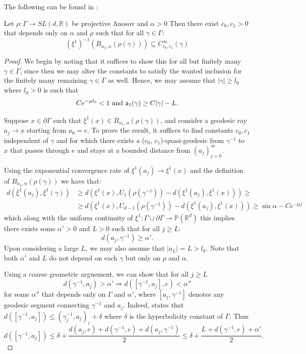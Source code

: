\documentclass{report}
\begin{document}
The following can be found in \cite[Proposition 3.3]{pozzetti_anosov_2023}:
\begin{proposition}
    Let $\rho: \Gamma \to SL(d, \mathbb R)$ be projective Anosov and $\alpha > 0$
    Then there exist $c_0, c_1 > 0$ that depends only on $\alpha$ and $\rho$ such that for all $\gamma \in \Gamma$:
    \[
        (\xi^1)^{-1}(B_{\alpha_1, \alpha}(\rho(\gamma))) \subseteq C_{c_0,c_1}^\infty(\gamma)
    \]
\end{proposition}
\begin{proof}
    We begin by noting that it suffices to show this for all but finitely many $\gamma \in \Gamma$, since then we may alter the constants to satisfy the wanted inclusion for the finitely many remaining $\gamma \in \Gamma$ as well. 
    Hence, we may assume that $|\gamma| \geq l_0$ where $l_0 > 0$ is such that 
    \[
        Ce^{-\mu l_0} < 1 \text{ and } {\sf a}_1(\gamma) \geq C|\gamma| - L.
    \]

    Suppose $x \in \partial \Gamma$ such that $\xi^1(x) \in B_{\alpha_1, \alpha}(\rho(\gamma))$, and consider a geodesic ray $a_j \to x$ starting from $a_0 = e$.
    To prove the result, it suffices to find constants $c_0, c_1$ independent of $\gamma$ and for which there exists a ($c_0$, $c_1$)-quasi-geodesic from $\gamma^{-1}$ to $x$ that passes through $e$ and stays at a bounded distance from $(a_j)_{j=0}^\infty$.

    Using the exponential convergence rate of $\xi^1(a_j) \to \xi^1(x)$ and the definition of $B_{\alpha_1, \alpha}(\rho(\gamma))$ we have that:
    \begin{align*}
        d(\xi^1(a_j), \xi^1(\gamma)) &\geq
        d(\xi^1(x), U_1(\rho(\gamma^{-1}))-d(\xi^1(a_j), \xi^1(x)))
        \geq \\
        &\geq
        d(\xi^1(x), U_{d-1}(\rho(\gamma^{-1}))-d(\xi^1(a_j), \xi^1(x)))
        \geq
        \sin \alpha - Ce^{-\mu j}
    \end{align*}
    which along with the uniform continuity of $\xi^1: \Gamma \cup \partial \Gamma \to \mathbb P(\mathbb R^d)$ this implies there exists some $\alpha' > 0$ and $L>0$ such that for all $j\geq L$:
    \[
        d(a_j, \gamma^{-1}) \geq \alpha'.
    \]
    Upon considering a large $L$, we may also assume that $|a_L| = L > l_0$. Note that both $\alpha'$ and $L$ do not depend on each $\gamma$ but only on $\rho$ and $\alpha$.

    Using a coarse geometric arguement, we can show that for all $j \geq L$
    \[
        d(\gamma^{-1}, a_j) > \alpha' \Rightarrow
        d([\gamma^{-1}, a_j], e) < \alpha''
    \]
    for some $\alpha''$ that depends only on $\Gamma$ and $\alpha'$, where $[a_j, \gamma^{-1}]$ denotes any geodesic segment connecting $\gamma^{-1}$ and $a_j$.
    Indeed, \cite[Lemme 2.17]{ghys2013groupes} states that 
    $d([\gamma^{-1}, a_j]) \leq (\gamma_j^{-1}, a_j)_e + \delta$
    where $\delta$ is the hyperbolicity constant of $\Gamma$.
    Thus
    \[
        d([\gamma^{-1}, a_j]) \leq \delta + \frac{d(a_j, e) + d(\gamma^{-1},e) + d(a_j, \gamma^{-1})}{2} \leq
        \delta + \frac{L + d(\gamma^{-1}, e) + \alpha'}{2}.
    \]


\end{proof}
\end{document}
